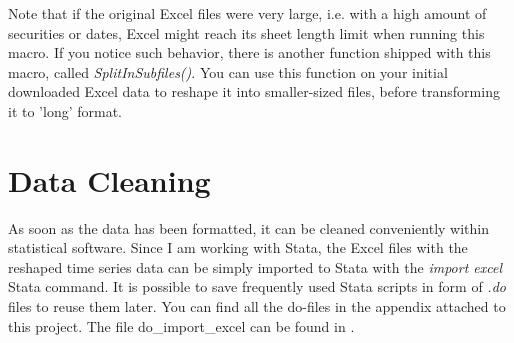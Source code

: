 Note that if the original Excel files were very large, i.e. with a high amount of securities or dates, Excel might reach its sheet length limit when running this macro. If you notice such behavior, there is another function shipped with this macro, called \textit{SplitInSubfiles()}. You can use this function on your initial downloaded Excel data to reshape it into smaller-sized files, before transforming it to 'long' format. 

\section{Data Cleaning} \label{section:data-cleaning}
As soon as the data has been formatted, it can be cleaned conveniently within statistical software. Since I am working with Stata, the Excel files with the reshaped time series data can be simply imported to Stata with the  \textit{import excel} Stata command. It is possible to save frequently used Stata scripts in form of \textit{.do} files to reuse them later. You can find all the do-files in the appendix attached to this project. The file do\_import\_excel can be found in . %





